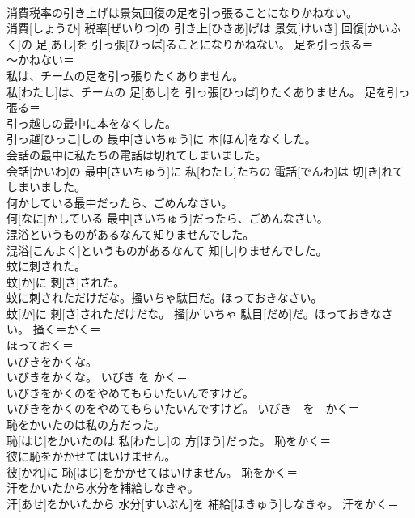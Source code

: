 \documentclass[8pt]{extreport}
\begin{document}
\begin{CJK}{UTF8}{min}
\\	消費税率の引き上げは景気回復の足を引っ張ることになりかねない。	
\\	消費[しょうひ] 税率[ぜいりつ]の 引き上[ひきあ]げは 景気[けいき] 回復[かいふく]の 足[あし]を 引っ張[ひっぱ]ることになりかねない。	足を引っ張る＝ 
\\	〜かねない＝ 
\\	私は、チームの足を引っ張りたくありません。	
\\	私[わたし]は、チームの 足[あし]を 引っ張[ひっぱ]りたくありません。	足を引っ張る＝ 
\\	引っ越しの最中に本をなくした。	
\\	引っ越[ひっこ]しの 最中[さいちゅう]に 本[ほん]をなくした。	
\\	会話の最中に私たちの電話は切れてしまいました。	
\\	会話[かいわ]の 最中[さいちゅう]に 私[わたし]たちの 電話[でんわ]は 切[き]れてしまいました。	
\\	何かしている最中だったら、ごめんなさい。	
\\	何[なに]かしている 最中[さいちゅう]だったら、ごめんなさい。	
\\	混浴というものがあるなんて知りませんでした。	
\\	混浴[こんよく]というものがあるなんて 知[し]りませんでした。	
\\	蚊に刺された。	
\\	蚊[か]に 刺[さ]された。	
\\	蚊に刺されただけだな。掻いちゃ駄目だ。ほっておきなさい。	
\\	蚊[か]に 刺[さ]されただけだな。 掻[か]いちゃ 駄目[だめ]だ。ほっておきなさい。	掻く＝かく＝ 
\\	ほっておく＝ 
\\	いびきをかくな。	
\\	いびきをかくな。	いびき を かく＝ 
\\	いびきをかくのをやめてもらいたいんですけど。	
\\	いびきをかくのをやめてもらいたいんですけど。	いびき　を　かく＝ 
\\	恥をかいたのは私の方だった。	
\\	恥[はじ]をかいたのは 私[わたし]の 方[ほう]だった。	恥をかく＝ 
\\	彼に恥をかかせてはいけません。	
\\	彼[かれ]に 恥[はじ]をかかせてはいけません。	恥をかく＝ 
\\	汗をかいたから水分を補給しなきゃ。	
\\	汗[あせ]をかいたから 水分[すいぶん]を 補給[ほきゅう]しなきゃ。	汗をかく＝ 

\end{CJK}
\end{document}
